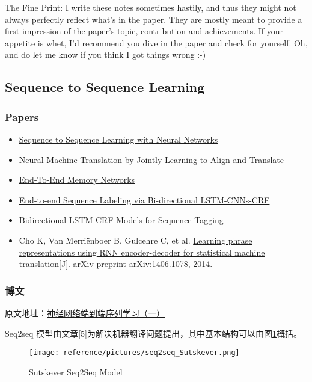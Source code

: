\documentclass[10pt,a4paper]{ctexbook}
\begin{document}
The Fine Print: I write these notes sometimes hastily, and thus they might not always perfectly reflect what's in the paper. They are mostly meant to provide a first impression of the paper's topic, contribution and achievements. If your appetite is whet, I'd recommend you dive in the paper and check for yourself. Oh, and do let me know if you think I got things wrong :-)


\subsection{Sequence to Sequence Learning}

\subsubsection{Papers}
\begin{itemize}
\item \href{https://arxiv.org/pdf/1409.3215.pdf}{Sequence to Sequence Learning with Neural Networks}
\item \href{https://arxiv.org/abs/1409.0473}{Neural Machine Translation by Jointly Learning to Align and Translate}
\item \href{https://arxiv.org/abs/1503.08895}{End-To-End Memory Networks}
\item \href{https://arxiv.org/pdf/1603.01354v5.pdf}{End-to-end Sequence Labeling via Bi-directional LSTM-CNNs-CRF}
\item \href{https://arxiv.org/pdf/1508.01991v1.pdf}{Bidirectional LSTM-CRF Models for Sequence Tagging}
\item Cho K, Van Merriënboer B, Gulcehre C, et al. \href{http://arxiv.org/pdf/1406.1078}{Learning phrase representations using RNN encoder-decoder for statistical machine translation[J]}. arXiv preprint arXiv:1406.1078, 2014.
\end{itemize}

\subsubsection{博文}

原文地址：\href{http://blog.csdn.net/jackytintin/article/details/53352063}{神经网络端到端序列学习（一）}

Seq2seq 模型由文章[5]为解决机器翻译问题提出，其中基本结构可以由图\ref{fig:sutskever_seq2seq}概括。
\begin{figure}[ht]
    \centering
    \texttt{[image: reference/pictures/seq2seq\_Sutskever.png]}
    \caption{Sutskever Seq2Seq Model}
    \label{fig:sutskever_seq2seq}
\end{figure}
\end{document}
